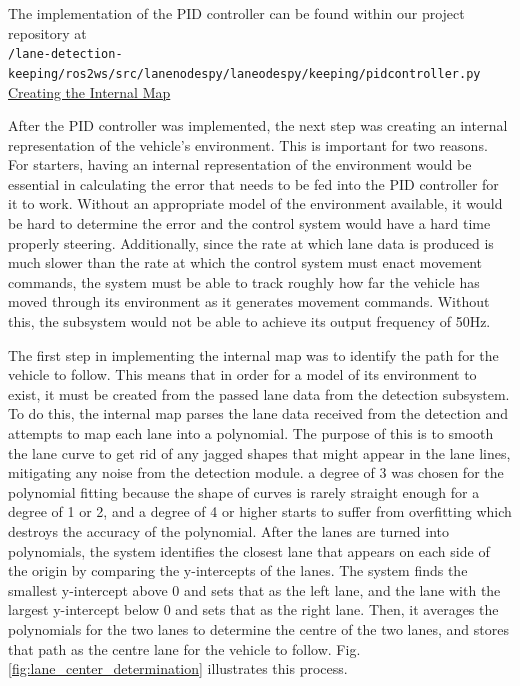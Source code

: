 \documentclass[titlepage,draft]{article}
\begin{document}
{The implementation of the PID controller can be found within our project
repository at \\\texttt{/lane-detection-keeping/ros2\textunderscore ws/src/lane\textunderscore nodes\textunderscore py/lane\textunderscore odes\textunderscore py/keeping/pid\textunderscore controller.py}
\\

\underline{Creating the Internal Map}

After the PID controller was implemented, the next step was creating an internal representation of the vehicle's environment. This is important for two reasons. For starters, having an internal representation of the environment would be essential in calculating the error that needs to be fed into the PID controller for it to work. Without an appropriate model of the environment available, it would be hard to determine the error and the control system would have a hard time properly steering. Additionally, since the rate at which lane data is produced is much slower than the rate at which the control system must enact movement commands, the system must be able to track roughly how far the vehicle has moved through its environment as it generates movement commands. Without this, the subsystem would not be able to achieve its output frequency of 50Hz.

The first step in implementing the internal map was to identify the path for the vehicle to follow. This means that in order for a model of its environment to exist, it must be created from the passed lane data from the detection subsystem. To do this, the internal map parses the lane data received from the detection and attempts to map each lane into a polynomial. The purpose of this is to smooth the lane curve to get rid of any jagged shapes that might appear in the lane lines, mitigating any noise from the detection module. a degree of 3 was chosen for the polynomial fitting because the shape of curves is rarely straight enough for a degree of 1 or 2, and a degree of 4 or higher starts to suffer from overfitting which destroys the accuracy of the polynomial. After the lanes are turned into polynomials, the system identifies the closest lane that appears on each side of the origin by comparing the y-intercepts of the lanes. The system finds the smallest y-intercept above 0 and sets that as the left lane, and the lane with the largest y-intercept below 0 and sets that as the right lane. Then, it averages the polynomials for the two lanes to determine the centre of the two lanes, and stores that path as the centre lane for the vehicle to follow. Fig. \ref{fig:lane_center_determination} illustrates this process.

}
\end{document}
